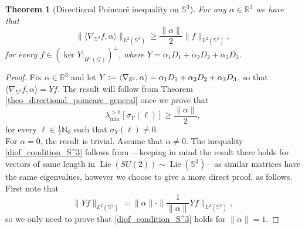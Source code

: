 \documentclass[11pt]{amsart}
\newtheorem{theorem}{Theorem}
\numberwithin{theorem}{section}
\numberwithin{equation}{section}
\theoremstyle{definition}
\numberwithin{example}{section}
\theoremstyle{definition}
\theoremstyle{definition}
\newcommand{\R}{\mathbb{R}}
\newcommand{\N}{\mathbb{N}}
\renewcommand{\S}{\mathbb{S}^3}
\newcommand{\defeq}{\vcentcolon=}
\begin{document}
\begin{theorem}[Directional Poincaré inequality on $\S$]\label{theo_directional_sphere}
    For any $\alpha\in\R^3$ we have that
    \begin{equation}\label{ineq_Poincaré_S3}
        \|\langle \nabla_{\mathbb{S}^3}f,\alpha\rangle \|_{L^2(\mathbb{S}^3)}\geq \frac{\|\alpha\|}{2}\|f\|_{L^2(\mathbb{S}^3)},
    \end{equation}
    for every $f\in (\ker Y|_{H^1(G)})^\perp$, where $Y=\alpha_1D_1+\alpha_2D_2+\alpha_3D_3$.
\end{theorem}
\begin{proof}
Fix $\alpha\in\R^3$ and let $Y\defeq\langle\nabla_{\mathbb{S}^3},\alpha\rangle =\alpha_1D_1+\alpha_2D_2+\alpha_3D_3$, so that $\langle \nabla_{\mathbb{S}^3}f,\alpha\rangle=Yf$. 
The result will follow from Theorem \ref{theo_directional_poincare_general} once we prove that 
\begin{equation}\label{diof_condition_S^3}
    \lambda_{\min}^{>0}[\sigma_Y(\ell)]\geq \frac{\|\alpha\|}{2},
\end{equation}
for every $\ell\in\frac{1}{2}\N_0$ such that $\sigma_Y(\ell)\neq 0$.\\
For $\alpha=0$, the result is trivial. Assume that  $\alpha\neq 0$. The inequality \eqref{diof_condition_S^3} follows from \cite[Proposition 12.2.4]{RT2010_book}---keeping in mind the result there holds for vectors of same length in $\operatorname{Lie}(SU(2))\sim \operatorname{Lie}(\mathbb{S}^3)$---as similar matrices have the same eigenvalues, however we choose to give a more direct proof, as follows. First note that 
\begin{equation*}
\|Y f\|_{L^2(\mathbb{S}^3)}=   \|\alpha\|\cdot\|{\textstyle\frac{1}{\|\alpha\|}}Y f\|_{L^2(\mathbb{S}^3)},    
\end{equation*}
so we only need to prove that \eqref{diof_condition_S^3} holds for $\|\alpha\|=1$.  


\end{proof}
\end{document}
